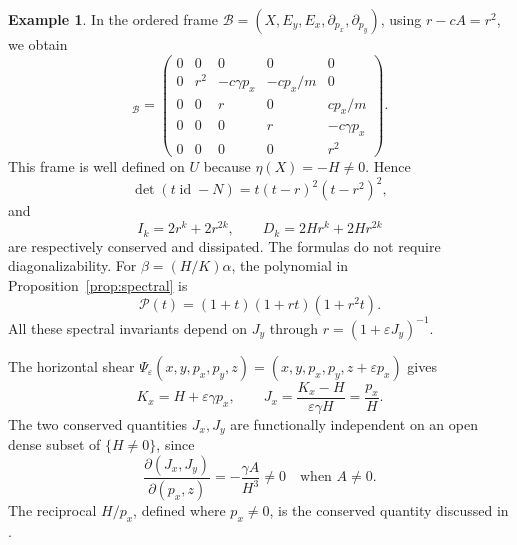 \documentclass[11pt,a4paper]{article}
\numberwithin{equation}{section}
\theoremstyle{definition}
\newtheorem{example}{Example}
\theoremstyle{remark}
\newcommand{\id}{\operatorname{id}}
\begin{document}
\begin{example}
In the ordered frame
$\mathcal B=(X,E_y,E_x,\partial_{p_x},\partial_{p_y})$,
using $r-cA=r^2$, we obtain
\begin{equation}
[N]_{\mathcal B}=
\begin{pmatrix}
0&0&0&0&0\\
0&r^2&-c\gamma p_x&-cp_x/m&0\\
0&0&r&0&cp_x/m\\
0&0&0&r&-c\gamma p_x\\
0&0&0&0&r^2
\end{pmatrix}.
\label{eq:gravity-matrix}
\end{equation}
This frame is well defined on $U$ because
$\eta(X)=-H\neq0$. Hence
\[
\det(t\id-N)=t(t-r)^2(t-r^2)^2,
\]
and
\begin{equation}
I_k=2r^k+2r^{2k},\qquad
D_k=2Hr^k+2Hr^{2k}
\label{eq:gravity-invariants}
\end{equation}
are respectively conserved and dissipated.
The formulas do not require diagonalizability.
For $\beta=(H/K)\alpha$, the polynomial in
Proposition~\ref{prop:spectral} is
\[
\mathcal P(t)=(1+t)(1+rt)(1+r^2t).
\]
All these spectral invariants depend on $J_y$ through
$r=(1+\varepsilon J_y)^{-1}$.

The horizontal shear
$\Psi_\varepsilon(x,y,p_x,p_y,z)
=(x,y,p_x,p_y,z+\varepsilon p_x)$ gives
\[
K_x=H+\varepsilon\gamma p_x,\qquad
J_x=\frac{K_x-H}{\varepsilon\gamma H}=\frac{p_x}{H}.
\]
The two conserved quantities $J_x,J_y$ are
functionally independent on an open dense subset
of $\{H\neq0\}$, since
\[
\frac{\partial(J_x,J_y)}{\partial(p_x,z)}
=-\frac{\gamma A}{H^3}\neq0
\quad\text{when }A\neq0.
\]
The reciprocal $H/p_x$, defined where $p_x\neq0$,
is the conserved quantity discussed in
\cite[Section~5.2]{GGMRR2020}.
\end{example}
\end{document}
